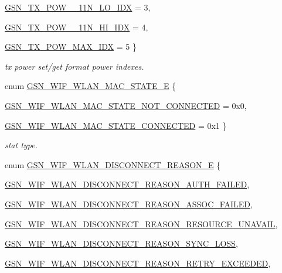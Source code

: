 \begin{DoxyCompactItemize}
\par
\hyperlink{a00640_gga75fc31972dc5127c4ee4b3e585ab0206a2b481aadf4f8c66408beb3dfa4d84fc7}{GSN\_\-TX\_\-POW\_\_\-11N\_\-LO\_\-IDX} =  3, 
\par
\hyperlink{a00640_gga75fc31972dc5127c4ee4b3e585ab0206a0d66ebcda580eb26e8347354d3087d70}{GSN\_\-TX\_\-POW\_\_\-11N\_\-HI\_\-IDX} =  4, 
\par
\hyperlink{a00640_gga75fc31972dc5127c4ee4b3e585ab0206a647770c3d643ef01c522760760b94172}{GSN\_\-TX\_\-POW\_\-MAX\_\-IDX} =  5
 \}
\begin{DoxyCompactList}\small\item\em tx power set/get format power indexes. \end{DoxyCompactList}\item 
enum \hyperlink{a00677_gaf26e714e09b57b3b2a5f21341613761d}{GSN\_\-WIF\_\-WLAN\_\-MAC\_\-STATE\_\-E} \{ \par
\hyperlink{a00640_ggaf26e714e09b57b3b2a5f21341613761da29bec55c1820017c55b7eebc1cbb2698}{GSN\_\-WIF\_\-WLAN\_\-MAC\_\-STATE\_\-NOT\_\-CONNECTED} =  0x0, 
\par
\hyperlink{a00640_ggaf26e714e09b57b3b2a5f21341613761daf9bfe447cd6ae519e8f1f06ce72a39a9}{GSN\_\-WIF\_\-WLAN\_\-MAC\_\-STATE\_\-CONNECTED} =  0x1
 \}
\begin{DoxyCompactList}\small\item\em stat type. \end{DoxyCompactList}\item 
enum \hyperlink{a00677_ga9dd854d0108dc49ff077a04e897e3518}{GSN\_\-WIF\_\-WLAN\_\-DISCONNECT\_\-REASON\_\-E} \{ \par
\hyperlink{a00640_gga9dd854d0108dc49ff077a04e897e3518af4c7545e3a50f0a4b80e819642f6fa11}{GSN\_\-WIF\_\-WLAN\_\-DISCONNECT\_\-REASON\_\-AUTH\_\-FAILED}, 
\par
\hyperlink{a00640_gga9dd854d0108dc49ff077a04e897e3518ab326383254792bc87a5b3dd116a846fa}{GSN\_\-WIF\_\-WLAN\_\-DISCONNECT\_\-REASON\_\-ASSOC\_\-FAILED}, 
\par
\hyperlink{a00640_gga9dd854d0108dc49ff077a04e897e3518aee4dc21ac6db977675d9681fa1f87131}{GSN\_\-WIF\_\-WLAN\_\-DISCONNECT\_\-REASON\_\-RESOURCE\_\-UNAVAIL}, 
\par
\hyperlink{a00640_gga9dd854d0108dc49ff077a04e897e3518a571260d569e804028dc21870862dbf8d}{GSN\_\-WIF\_\-WLAN\_\-DISCONNECT\_\-REASON\_\-SYNC\_\-LOSS}, 
\par
\hyperlink{a00640_gga9dd854d0108dc49ff077a04e897e3518acd39138402c119334dd5f6b3a18ee9c5}{GSN\_\-WIF\_\-WLAN\_\-DISCONNECT\_\-REASON\_\-RETRY\_\-EXCEEDED}, 

\end{DoxyCompactItemize}
